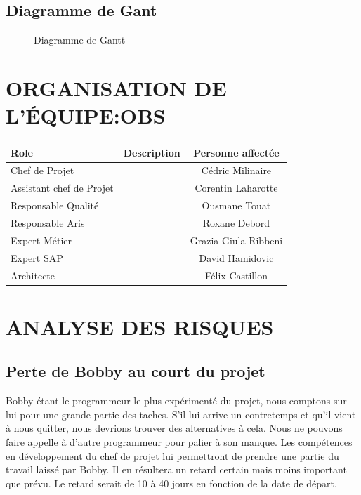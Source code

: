 \documentclass[]{scrartcl}
\begin{document}
\subsection{Diagramme de Gant}
\begin{figure}[H]
\caption{Diagramme de Gantt}
\end{figure}
\section{ORGANISATION DE L'ÉQUIPE:OBS}
\begin{center}
	\begin{tabular}{| l | c | c |}
	\hline
	Role                     & Description & Personne affectée  \\ 	\hline
	Chef de Projet           &             & Cédric Milinaire                   	\\ \hline
	Assistant chef de Projet &             & Corentin Laharotte                  	\\ \hline
	Responsable Qualité      &             & Ousmane Touat                 	\\ \hline
	Responsable Aris         &             & Roxane Debord                 	\\ \hline
	Expert Métier            &             & Grazia Giula Ribbeni                 	\\ \hline
	Expert SAP               &             & David Hamidovic                 	\\ \hline
	Architecte               &             & Félix Castillon  \\ 		\hline
	\end{tabular}
\end{center}

\section{ANALYSE DES RISQUES}
\subsection{Perte de Bobby au court du projet}
Bobby étant le programmeur le plus expérimenté du projet, nous comptons sur lui pour une grande partie des taches. S’il lui arrive un contretemps et qu’il vient à nous quitter, nous devrions trouver des alternatives à cela. Nous ne pouvons faire appelle à d’autre programmeur pour palier à son manque. Les compétences en développement du chef de projet lui permettront de prendre une partie du travail laissé par Bobby. Il en résultera un retard certain mais moins important que prévu. Le retard serait de 10 à 40 jours en fonction de la date de départ.


\begin{appendices}
\end{appendices}
\end{document}
